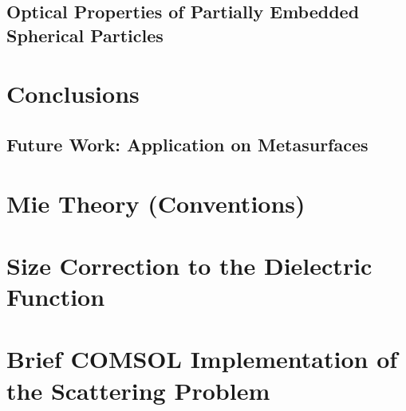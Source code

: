\documentclass[11pt]{Latex/Classes/PhDthesisPSnPDF}
\begin{document}
    \section{Optical Properties of Partially Embedded Spherical Particles}
%	

\chapter{Conclusions}
    \section{Future Work: Application on Metasurfaces}

\appendix

\chapter{Mie Theory (Conventions)}
  \label{app:MieCode}
  

\chapter{Size Correction to the Dielectric Function}
    \label{app:SizeCorrection}
    

\chapter{Brief COMSOL Implementation of the Scattering Problem}
    \label{app:COMSOL}
    


%
%

\setlength{}
\printbibliography

\newpage
\printindex
\end{document}
